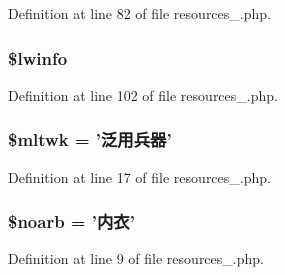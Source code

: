 Definition at line 82 of file resources\+\_.\+php.

\hypertarget{cache_2resources__1_8php_a8bc9ffb8d571d6f8b62846c5ba0b9749}{
\subsubsection[{\$lwinfo}]{\setlength{\rightskip}{0pt plus 5cm}\$lwinfo}}\label{cache_2resources__1_8php_a8bc9ffb8d571d6f8b62846c5ba0b9749}


Definition at line 102 of file resources\+\_.\+php.

\hypertarget{cache_2resources__1_8php_af12f55cfe5805f1081499f04e700478a}{
\subsubsection[{\$mltwk}]{\setlength{\rightskip}{0pt plus 5cm}\$mltwk = '泛用兵器'}}\label{cache_2resources__1_8php_af12f55cfe5805f1081499f04e700478a}


Definition at line 17 of file resources\+\_.\+php.

\hypertarget{cache_2resources__1_8php_a7042f4c981c7c1dd023648a96ee9a456}{
\subsubsection[{\$noarb}]{\setlength{\rightskip}{0pt plus 5cm}\$noarb = '内衣'}}\label{cache_2resources__1_8php_a7042f4c981c7c1dd023648a96ee9a456}


Definition at line 9 of file resources\+\_.\+php.

